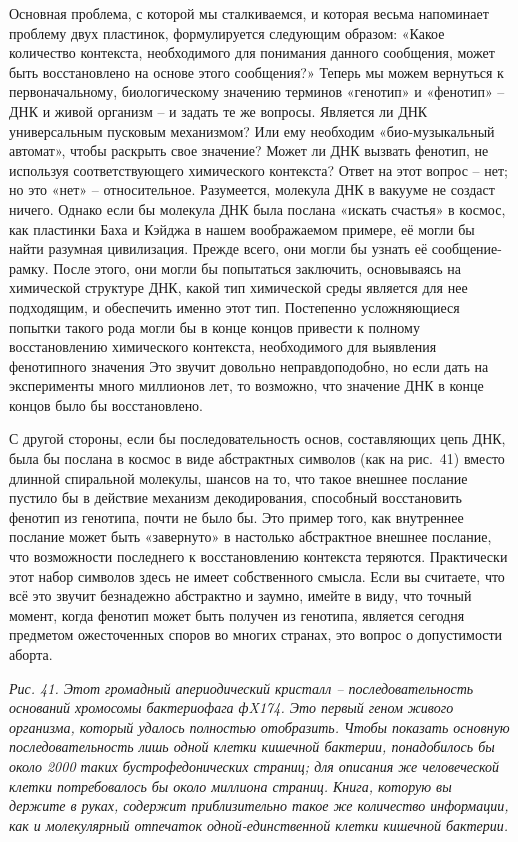 \documentclass[../main.tex]{subfiles}
\begin{document}
Основная проблема, с которой мы сталкиваемся, и которая весьма напоминает проблему двух пластинок, формулируется следующим образом: «Какое количество контекста, необходимого для понимания данного сообщения, может быть восстановлено на основе этого сообщения?» Теперь мы можем вернуться к первоначальному, биологическому значению терминов «генотип» и «фенотип» \--- ДНК и живой организм \--- и задать те же вопросы. Является ли ДНК универсальным пусковым механизмом? Или ему необходим «био-музыкальный автомат», чтобы раскрыть свое значение? Может ли ДНК вызвать фенотип, не используя соответствующего химического контекста? Ответ на этот вопрос \--- нет; но это «нет» \--- относительное. Разумеется, молекула ДНК в вакууме не создаст ничего. Однако если бы молекула ДНК была послана «искать счастья» в космос, как пластинки Баха и Кэйджа в нашем воображаемом примере, её могли бы найти разумная цивилизация. Прежде всего, они могли бы узнать её сообщение-рамку. После этого, они могли бы попытаться заключить, основываясь на химической структуре ДНК, какой тип химической среды является для нее подходящим, и обеспечить именно этот тип. Постепенно усложняющиеся попытки такого рода могли бы в конце концов привести к полному восстановлению химического контекста, необходимого для выявления фенотипного значения \@ Это звучит довольно неправдоподобно, но если дать на эксперименты много миллионов лет, то возможно, что значение ДНК в конце концов было бы восстановлено.

С другой стороны, если бы последовательность основ, составляющих цепь ДНК, была бы послана в космос в виде абстрактных символов (как на рис.~41) вместо длинной спиральной молекулы, шансов на то, что такое внешнее послание пустило бы в действие механизм декодирования, способный восстановить фенотип из генотипа, почти не было бы. Это пример того, как внутреннее послание может быть «завернуто» в настолько абстрактное внешнее послание, что возможности последнего к восстановлению контекста теряются. Практически этот набор символов здесь не имеет собственного смысла. Если вы считаете, что всё это звучит безнадежно абстрактно и заумно, имейте в виду, что точный момент, когда фенотип может быть получен из генотипа, является сегодня предметом ожесточенных споров во многих странах, это вопрос о допустимости аборта.

\emph{Рис. 41. Этот громадный апериодический кристалл \--- последовательность оснований хромосомы бактериофага фX174. Это первый геном живого организма, который удалось полностью отобразить. Чтобы показать основную последовательность лишь одной клетки кишечной бактерии, понадобилось бы около 2000 таких бустрофедонических страниц; для описания же человеческой клетки потребовалось бы около миллиона страниц. Книга, которую вы держите в руках, содержит приблизительно такое же количество информации, как и молекулярный отпечаток одной-единственной клетки кишечной бактерии.}
\end{document}
